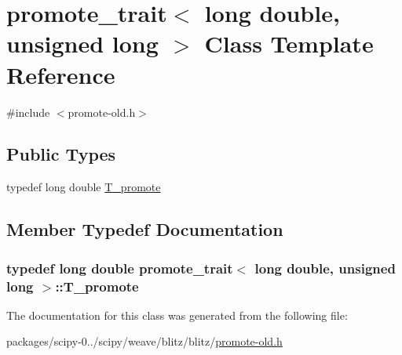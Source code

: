 \hypertarget{classpromote__trait_3_01long_01double_00_01unsigned_01long_01_4}{}\section{promote\+\_\+trait$<$ long double, unsigned long $>$ Class Template Reference}
\label{classpromote__trait_3_01long_01double_00_01unsigned_01long_01_4}


{\ttfamily \#include $<$promote-\/old.\+h$>$}

\subsection*{Public Types}
\begin{DoxyCompactItemize}
\item 
typedef long double \hyperlink{classpromote__trait_3_01long_01double_00_01unsigned_01long_01_4_a1578ed808ffb930c51739c94c1f61502}{T\+\_\+promote}
\end{DoxyCompactItemize}


\subsection{Member Typedef Documentation}
\hypertarget{classpromote__trait_3_01long_01double_00_01unsigned_01long_01_4_a1578ed808ffb930c51739c94c1f61502}{}
\subsubsection[{T\+\_\+promote}]{\setlength{\rightskip}{0pt plus 5cm}typedef long double {\bf promote\+\_\+trait}$<$ long double, unsigned long $>$\+::{\bf T\+\_\+promote}}\label{classpromote__trait_3_01long_01double_00_01unsigned_01long_01_4_a1578ed808ffb930c51739c94c1f61502}


The documentation for this class was generated from the following file\+:\begin{DoxyCompactItemize}
\item 
packages/scipy-\/0../scipy/weave/blitz/blitz/\hyperlink{promote-old_8h}{promote-\/old.\+h}\end{DoxyCompactItemize}
